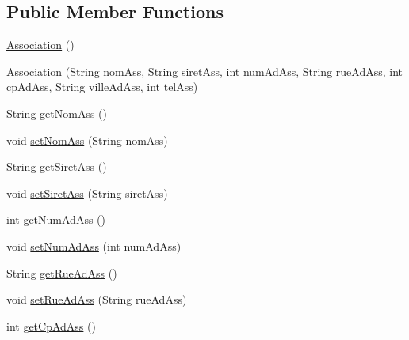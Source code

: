 \subsection*{Public Member Functions}
\begin{DoxyCompactItemize}
\item 
\hyperlink{classcom_1_1ecetech_1_1bti4_1_1itproject_1_1classified_1_1beans_1_1_association_a17d6f1725fe02b8e4534c9ecb04d8541}{Association} ()
\item 
\hyperlink{classcom_1_1ecetech_1_1bti4_1_1itproject_1_1classified_1_1beans_1_1_association_a064ee8543696e79afe38f33c2c967cfe}{Association} (String nom\+Ass, String siret\+Ass, int num\+Ad\+Ass, String rue\+Ad\+Ass, int cp\+Ad\+Ass, String ville\+Ad\+Ass, int tel\+Ass)
\item 
String \hyperlink{classcom_1_1ecetech_1_1bti4_1_1itproject_1_1classified_1_1beans_1_1_association_a2b6c89b2438c1914daeff46d61338cac}{get\+Nom\+Ass} ()
\item 
void \hyperlink{classcom_1_1ecetech_1_1bti4_1_1itproject_1_1classified_1_1beans_1_1_association_a882c3d46da0221ea90af71f1463cc2f4}{set\+Nom\+Ass} (String nom\+Ass)
\item 
String \hyperlink{classcom_1_1ecetech_1_1bti4_1_1itproject_1_1classified_1_1beans_1_1_association_a3d717b1c88eaf9a990d64f9ed436eebc}{get\+Siret\+Ass} ()
\item 
void \hyperlink{classcom_1_1ecetech_1_1bti4_1_1itproject_1_1classified_1_1beans_1_1_association_aab5103a1d73a114d348341ac0fce28c3}{set\+Siret\+Ass} (String siret\+Ass)
\item 
int \hyperlink{classcom_1_1ecetech_1_1bti4_1_1itproject_1_1classified_1_1beans_1_1_association_a28727ad9fc4568bb08a352d5d3109493}{get\+Num\+Ad\+Ass} ()
\item 
void \hyperlink{classcom_1_1ecetech_1_1bti4_1_1itproject_1_1classified_1_1beans_1_1_association_a4fb8d7006ef7adc7b86dcdf856365209}{set\+Num\+Ad\+Ass} (int num\+Ad\+Ass)
\item 
String \hyperlink{classcom_1_1ecetech_1_1bti4_1_1itproject_1_1classified_1_1beans_1_1_association_ad5dfa0d714b02e64f6a4babc844ccf95}{get\+Rue\+Ad\+Ass} ()
\item 
void \hyperlink{classcom_1_1ecetech_1_1bti4_1_1itproject_1_1classified_1_1beans_1_1_association_a20cf5b575f77131b065a3d9198b821d5}{set\+Rue\+Ad\+Ass} (String rue\+Ad\+Ass)
\item 
int \hyperlink{classcom_1_1ecetech_1_1bti4_1_1itproject_1_1classified_1_1beans_1_1_association_acc3d948f39a2ad79d9edaa784b9847e9}{get\+Cp\+Ad\+Ass} ()

\end{DoxyCompactItemize}
